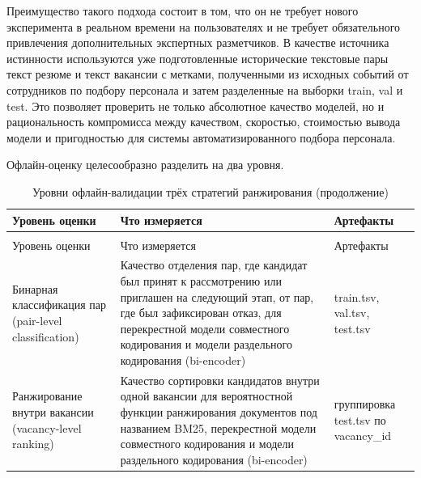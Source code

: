 Преимущество такого подхода состоит в том, что он не требует нового эксперимента в реальном времени на пользователях и не требует обязательного привлечения дополнительных экспертных разметчиков. В качестве источника истинности используются уже подготовленные исторические текстовые пары текст резюме и текст вакансии с метками, полученными из исходных событий от сотрудников по подбору персонала и затем разделенные на выборки train, val и test. Это позволяет проверить не только абсолютное качество моделей, но и рациональность компромисса между качеством, скоростью, стоимостью вывода модели и пригодностью для системы автоматизированного подбора персонала.\par
Офлайн-оценку целесообразно разделить на два уровня.\par
{}
\begingroup
\setlength{\tabcolsep}{3pt}
\renewcommand{\arraystretch}{1}
{\linespread{1}\selectfont
\begin{longtable}{|P{0.30\textwidth}|P{0.34\textwidth}|P{0.28\textwidth}|}
\caption{Уровни офлайн-валидации трёх стратегий ранжирования}\label{tbl:offline}\\*
\hline
Уровень оценки & Что измеряется & Артефакты \\
\hline
\endfirsthead
\caption[]{Уровни офлайн-валидации трёх стратегий ранжирования (продолжение)}\\*
\hline
Уровень оценки & Что измеряется & Артефакты \\
\hline
\endhead
\hline
\endfoot
\hline
\endlastfoot
Бинарная классификация пар (pair-level classification) & Качество отделения пар, где кандидат был принят к рассмотрению или приглашен на следующий этап, от пар, где был зафиксирован отказ, для перекрестной модели совместного кодирования и модели раздельного кодирования (bi-encoder) & train.tsv, val.tsv, test.tsv \\
\hline
Ранжирование внутри вакансии (vacancy-level ranking) & Качество сортировки кандидатов внутри одной вакансии для вероятностной функции ранжирования документов под названием BM25, перекрестной модели совместного кодирования и модели раздельного кодирования (bi-encoder) & группировка test.tsv по vacancy\_id \\
\end{longtable}
}
\endgroup
